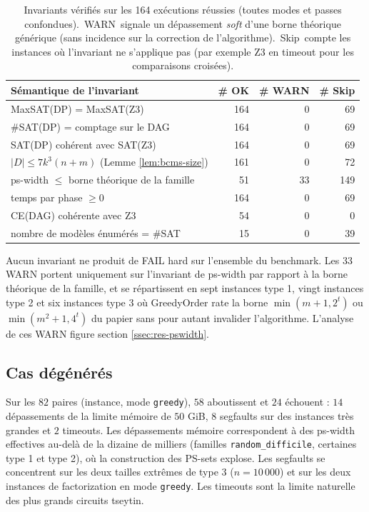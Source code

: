 \documentclass[11pt,a4paper]{report}
\theoremstyle{plain}
\theoremstyle{definition}
\begin{document}
\begin{table}[htbp]
\centering
\caption{Invariants vérifiés sur les 164 exécutions réussies (toutes
modes et passes confondues). \og\,WARN\,\fg{} signale un dépassement
\emph{soft} d'une borne théorique générique (sans incidence sur la
correction de l'algorithme). \og\,Skip\,\fg{} compte les instances où
l'invariant ne s'applique pas (par exemple Z3 en timeout pour les
comparaisons croisées).}
\label{tab:res-invariants}
\begin{tabular}{lrrr}
\toprule
Sémantique de l'invariant & \# OK & \# WARN & \# Skip \\
\midrule
MaxSAT(DP) = MaxSAT(Z3)                              & 164 & 0  & 69  \\
\#SAT(DP) = comptage sur le DAG                      & 164 & 0  & 69  \\
SAT(DP) cohérent avec SAT(Z3)                        & 164 & 0  & 69  \\
$|D| \leq 7 k^3 (n + m)$ (Lemme \ref{lem:bcms-size}) & 161 & 0  & 72  \\
ps-width $\leq$ borne théorique de la famille        & 51  & 33 & 149 \\
temps par phase $\geq 0$                             & 164 & 0  & 69  \\
CE(DAG) cohérente avec Z3                            & 54  & 0  & 0   \\
nombre de modèles énumérés = \#SAT                   & 15  & 0  & 39  \\
\bottomrule
\end{tabular}
\end{table}

Aucun invariant ne produit de FAIL hard sur l'ensemble du benchmark.
Les 33 WARN portent uniquement sur l'invariant de ps-width par
rapport à la borne théorique de la famille, et se répartissent en
sept instances type 1, vingt instances type 2 et six instances type
3 où GreedyOrder rate la borne $\min(m+1, 2^t)$ ou
$\min(m^2+1, 4^t)$ du papier \cite{saether2015} sans pour autant
invalider l'algorithme. L'analyse de ces WARN figure
section \ref{ssec:res-pswidth}.

\subsection{Cas dégénérés}
\label{ssec:res-degeneres}

Sur les $82$ paires (instance, mode \texttt{greedy}), $58$
aboutissent et $24$ échouent : $14$ dépassements de la limite
mémoire de $50$ GiB, $8$ segfaults sur des instances très grandes et
$2$ timeouts. Les dépassements mémoire correspondent à des
ps-width effectives au-delà de la dizaine de milliers (familles
\texttt{random\_difficile}, certaines type 1 et type 2), où la
construction des PS-sets explose. Les segfaults se concentrent sur
les deux tailles extrêmes de type 3 ($n = 10\,000$) et sur les
deux instances de factorization en mode \texttt{greedy}. Les
timeouts sont la limite naturelle des plus grands circuits tseytin.
\end{document}
